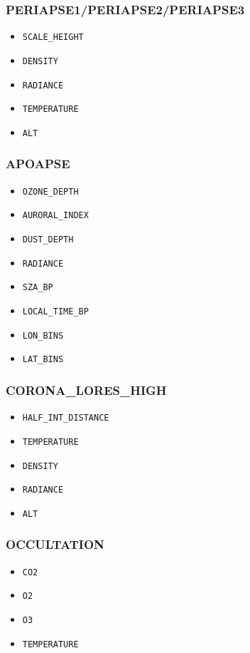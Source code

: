 \documentclass{article}
\begin{document}
\subsubsection{PERIAPSE1/PERIAPSE2/PERIAPSE3}
\begin{itemize}
    \item \texttt{SCALE\_HEIGHT}
    \item \texttt{DENSITY}
    \item \texttt{RADIANCE}
    \item \texttt{TEMPERATURE}
    \item \texttt{ALT}
\end{itemize}
\subsubsection{APOAPSE}
\begin{itemize}
    \item \texttt{OZONE\_DEPTH}
    \item \texttt{AURORAL\_INDEX}
    \item \texttt{DUST\_DEPTH}
    \item \texttt{RADIANCE}
    \item \texttt{SZA\_BP}
    \item \texttt{LOCAL\_TIME\_BP}
    \item \texttt{LON\_BINS}
    \item \texttt{LAT\_BINS}
\end{itemize}
\subsubsection{CORONA\_LORES\_HIGH}
\begin{itemize}
    \item \texttt{HALF\_INT\_DISTANCE}
    \item \texttt{TEMPERATURE}
    \item \texttt{DENSITY}
    \item \texttt{RADIANCE}
    \item \texttt{ALT}
\end{itemize}
\subsubsection{OCCULTATION}
\begin{itemize}
    \item \texttt{CO2}
    \item \texttt{O2}
    \item \texttt{O3}
    \item \texttt{TEMPERATURE}
\end{itemize}
\end{document}
